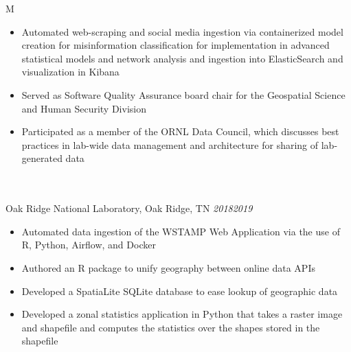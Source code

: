 \documentclass[10pt]{article}%
\begin{document}
\begin{tabularx}{\linewidth}{M}
\begin{itemize}[topsep=-12pt,parsep=0em]
            \item Automated web-scraping and social media ingestion via containerized model creation for misinformation classification for implementation in advanced statistical models and network analysis and ingestion into ElasticSearch and visualization in Kibana %
            \item Served as Software Quality Assurance board chair for the Geospatial Science and Human Security Division %
            \item Participated as a member of the ORNL Data Council, which discusses best practices in lab-wide data management and architecture for sharing of lab-generated data %
        \end{itemize} \\
         \\
        Oak Ridge National Laboratory, Oak Ridge, TN \textit{2018\textemdash{}2019} \\
        \begin{itemize}[topsep=-12pt,parsep=0em]
            \setlength\itemsep{0em}
            \item Automated data ingestion of the WSTAMP Web Application via the use of R, Python, Airflow, and Docker %
            \item Authored an R package to unify geography between online data APIs %
            \item Developed a SpatiaLite SQLite database to ease lookup of geographic data %
            \item Developed a zonal statistics application in Python that takes a raster image and shapefile and computes the statistics over the shapes stored in the shapefile %
        \end{itemize} \\
    \end{tabularx}
\end{document}
